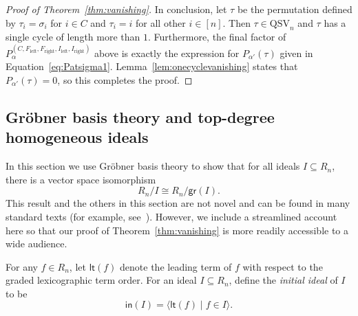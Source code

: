 \documentclass[12pt]{amsart}
\theoremstyle{definition}
\theoremstyle{remark}
\numberwithin{equation}{section}
\newcommand{\QSV}{\mathrm{QSV}}
\begin{document}
\begin{proof}[Proof of Theorem~\ref{thm:vanishing}]
In conclusion, let $\tau$ be the permutation defined by $\tau_{i} = \sigma_{i}$ for $i \in C$ and $\tau_{i} = i$ for all other $i \in [n]$.  
Then $\tau \in \QSV_{n}$ and $\tau$ has a single cycle of length more than $1$.  
Furthermore, the final factor of $P_{\alpha}^{(C, F_{\text{left}}, F_{\text{right}}, I_{\text{left}}, I_{\text{right}})}$ above is exactly the expression for $P_{\alpha'}(\tau)$ given in Equation~\eqref{eq:Patsigma1}.  
Lemma~\ref{lem:onecyclevanishing} states that $P_{\alpha'}(\tau) = 0$, so this completes the proof.
\end{proof}

\subsection{Gr\"{o}bner basis theory and top-degree homogeneous ideals}
\label{sec:Grobner}


In this section we use Gr\"{o}bner basis theory to show that for all ideals $I \subseteq R_{n}$, there is a vector space isomorphism
\[
R_{n} \big/ I \cong R_{n}\big/\mathsf{gr}(I).
\]
This result and the others in this section are not novel and can be found in many standard texts (for example, see~\cite{CLO}).
However, we include a streamlined account here so that our proof of Theorem~\ref{thm:vanishing} is more readily accessible to a wide audience.  

For any $f \in R_{n}$, let $\mathsf{lt}(f)$ denote the leading term of $f$ with respect to the graded lexicographic term order.  For an ideal $I \subseteq R_{n}$, define the \emph{initial ideal} of $I$ to be 
\[
\mathsf{in}(I) = \langle \mathsf{lt}(f) \;|\; f \in I \rangle.
\]
\end{document}
